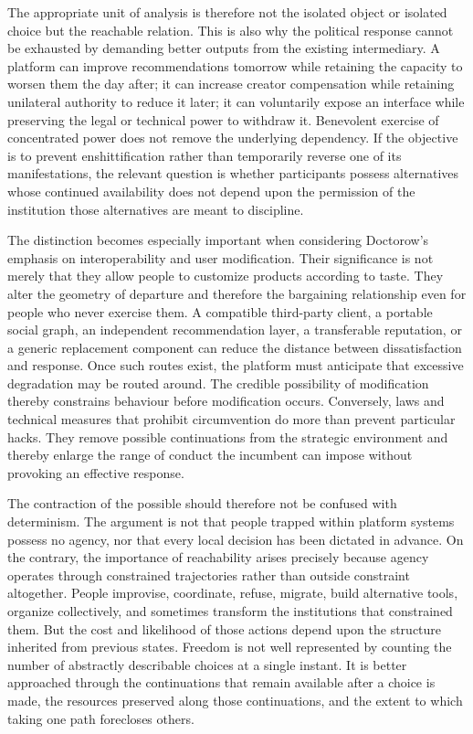 \documentclass[11pt]{article}
\begin{document}
The appropriate unit of analysis is therefore not the isolated object or isolated choice but the reachable relation. This is also why the political response cannot be exhausted by demanding better outputs from the existing intermediary. A platform can improve recommendations tomorrow while retaining the capacity to worsen them the day after; it can increase creator compensation while retaining unilateral authority to reduce it later; it can voluntarily expose an interface while preserving the legal or technical power to withdraw it. Benevolent exercise of concentrated power does not remove the underlying dependency. If the objective is to prevent enshittification rather than temporarily reverse one of its manifestations, the relevant question is whether participants possess alternatives whose continued availability does not depend upon the permission of the institution those alternatives are meant to discipline.

The distinction becomes especially important when considering Doctorow's emphasis on interoperability and user modification. Their significance is not merely that they allow people to customize products according to taste. They alter the geometry of departure and therefore the bargaining relationship even for people who never exercise them. A compatible third-party client, a portable social graph, an independent recommendation layer, a transferable reputation, or a generic replacement component can reduce the distance between dissatisfaction and response. Once such routes exist, the platform must anticipate that excessive degradation may be routed around. The credible possibility of modification thereby constrains behaviour before modification occurs. Conversely, laws and technical measures that prohibit circumvention do more than prevent particular hacks. They remove possible continuations from the strategic environment and thereby enlarge the range of conduct the incumbent can impose without provoking an effective response.

The contraction of the possible should therefore not be confused with determinism. The argument is not that people trapped within platform systems possess no agency, nor that every local decision has been dictated in advance. On the contrary, the importance of reachability arises precisely because agency operates through constrained trajectories rather than outside constraint altogether. People improvise, coordinate, refuse, migrate, build alternative tools, organize collectively, and sometimes transform the institutions that constrained them. But the cost and likelihood of those actions depend upon the structure inherited from previous states. Freedom is not well represented by counting the number of abstractly describable choices at a single instant. It is better approached through the continuations that remain available after a choice is made, the resources preserved along those continuations, and the extent to which taking one path forecloses others.
\end{document}
